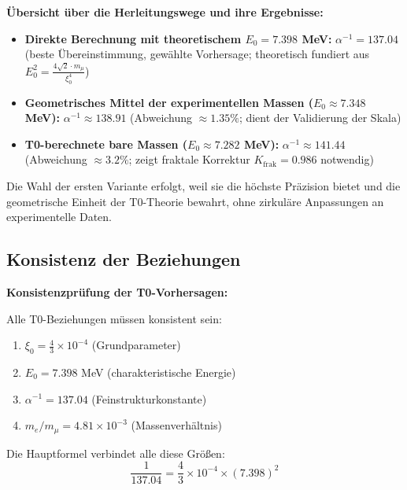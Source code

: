 \documentclass[12pt,a4paper]{article}
\newcommand{\xipar}{\xi_0}
\newcommand{\Kfrak}{K_{\text{frak}}}
\newcommand{\Ezero}{E_0}
\begin{document}
	\begin{foundation}
		\textbf{Übersicht über die Herleitungswege und ihre Ergebnisse:}
		\begin{itemize}
			\item \textbf{Direkte Berechnung mit theoretischem $\Ezero = 7.398$ MeV:} $\alpha^{-1} = 137.04$ (beste Übereinstimmung, gewählte Vorhersage; theoretisch fundiert aus $\Ezero^2 = \frac{4\sqrt{2} \cdot m_\mu}{\xipar^4}$)
			\item \textbf{Geometrisches Mittel der experimentellen Massen ($\Ezero \approx 7.348$ MeV):} $\alpha^{-1} \approx 138.91$ (Abweichung $\approx 1.35\%$; dient der Validierung der Skala)
			\item \textbf{T0-berechnete bare Massen ($\Ezero \approx 7.282$ MeV):} $\alpha^{-1} \approx 141.44$ (Abweichung $\approx 3.2\%$; zeigt fraktale Korrektur $\Kfrak = 0.986$ notwendig)
		\end{itemize}
		
		Die Wahl der ersten Variante erfolgt, weil sie die höchste Präzision bietet und die geometrische Einheit der T0-Theorie bewahrt, ohne zirkuläre Anpassungen an experimentelle Daten.
	\end{foundation}	
	
	
	\subsection{Konsistenz der Beziehungen}
	
	\begin{keyresult}
		\textbf{Konsistenzprüfung der T0-Vorhersagen:}
		
		Alle T0-Beziehungen müssen konsistent sein:
		\begin{enumerate}
			\item $\xipar = \frac{4}{3} \times 10^{-4}$ (Grundparameter)
			\item $\Ezero = 7.398$ MeV (charakteristische Energie)
			\item $\alpha^{-1} = 137.04$ (Feinstrukturkonstante)
			\item $m_e/m_\mu = 4.81 \times 10^{-3}$ (Massenverhältnis)
		\end{enumerate}
		
		Die Hauptformel verbindet alle diese Größen:
		\begin{equation}
			\frac{1}{137.04} = \frac{4}{3} \times 10^{-4} \times (7.398)^2
		\end{equation}
	\end{keyresult}
	
\end{document}
